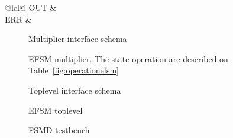\documentclass[]{IEEEtran}
\begin{document}
\begin{table}[h]
\begin{tabular}{@{}lcl@{}}
			OUT    &                                                                                           \\ \midrule
			ERR    &                                                                                                                                                          \\ \bottomrule
		\end{tabular}
	\caption{Operation of the EFSM multiplier }
	\label{fig:operationefsm}
	\end{table}

		\newpage
			\begin{figure}[t]
			\centering
			
			\caption{Multiplier interface schema}
			\label{fig:mul_ieee_754_schema}
		\end{figure}
	
		\newpage
	\begin{figure}[t]
		\centering
		
		\caption{EFSM multiplier. The state operation are described on Table~\ref{fig:operationefsm}}
		\label{fig:efsm_mul}
	\end{figure}

		\newpage
\begin{figure}[t]
	\centering
	
	\caption{Toplevel interface schema}
	\label{fig:tl}
\end{figure}


\begin{figure}[t]
	\centering
	
	\caption{EFSM toplevel}
	\label{fig:efsm_tl}
\end{figure}


\begin{figure}[t]
	\centering
	
	\caption{FSMD testbench}
	\label{fig:fsmd_tb}
\end{figure}
\end{document}
